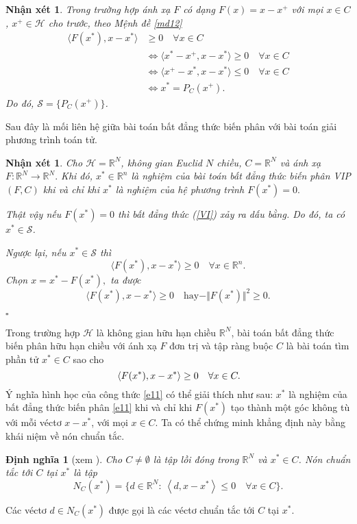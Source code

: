 \documentclass[14pt, oneside,A4paper]{book}
\theoremstyle{plain}
\newcommand{\eproof}{\hfill $\square$}
\newtheorem{nx}[theorem]{\bf Nhận xét}
\newtheorem{dn}[theorem]{\bf Định nghĩa}
\begin{document}
\begin{nx}\rm Trong trường hợp ánh xạ $F$ có dạng $F(x) = x- x^+$ với mọi $x\in C$, $x^+\in \mathcal H$ cho trước, theo Mệnh đề \ref{md12}
	\begin{align*}
	\langle F(x^*), x- x^*\rangle & \ge 0 \quad  \forall x\in C \\
	&\Leftrightarrow  \langle x^*-x^+, x - x^* \rangle \ge 0 \quad \forall x\in C\\
	& \Leftrightarrow  \langle x^+-x^*, x - x^* \rangle \le 0 \quad \forall x\in C  \\
	& \Leftrightarrow   x^* = P_C(x^+).
	\end{align*}
	Do đó, $\mathcal S = \{P_C{(x^+)} \}$.
\end{nx}

Sau đây là mối liên hệ giữa bài toán bất đẳng thức biến phân với bài toán giải phương trình toán tử.
\begin{nx} \rm Cho $\mathcal H = \mathbb {R}^N$, không gian Euclid $N$ chiều, $C= \mathbb {R}^N $ và ánh xạ $F: \mathbb {R}^N\rightarrow \mathbb {R}^N.$ Khi đó, $x^*\in \mathbb {R}^n$ là nghiệm của bài toán bất đẳng thức biến phân VIP$(F,C)$ khi và chỉ khi $x^*$ là nghiệm của hệ phương trình $F(x^*)= 0.$
	
	Thật vậy nếu  $F(x^*)= 0$ thì bất đẳng thức (\ref{VI}) xảy ra dấu bằng. Do đó, ta có $x^*\in \mathcal S$.
	
	Ngược lại, nếu $x^*\in \mathcal S$ thì
	$$\langle F(x^*), x- x^*\rangle  \ge 0 \quad \forall x\in \mathbb {R}^n.$$
	Chọn $x = x^* -F(x^*),$ ta được
	$$\langle F(x^*), x- x^*\rangle  \ge 0\quad \text{hay} -\Vert F(x^*) \Vert^2 \geq 0. $$ 
	
	\eproof
\end{nx}

Trong trường hợp $\mathcal H$ là không gian hữu hạn chiều $\mathbb {R}^N$, bài toán bất đẳng thức biến phân hữu hạn chiều với ánh xạ $F$ đơn trị và tập ràng buộc $C$ là bài toán tìm phần tử $x^* \in C$ sao cho
	\begin{equation}{\label{e11}}
	\left\langle F(x^*), x- x^* \right\rangle \geq 0 \quad \forall x \in C. 
	\end{equation}
Ý nghĩa hình học của công thức \eqref{e11} có thể giải thích như sau: $x^*$ là nghiệm của bất đẳng thức biến phân \eqref{e11} khi và chỉ khi $F(x^*)$ tạo thành một góc không tù với mỗi véctơ $x-x^*$, với mọi $x \in C$. Ta có thể chứng minh khẳng định này bằng khái niệm về nón chuẩn tắc.
\begin{dn}[xem \cite{Kon}] \rm 
	Cho $C \ne \emptyset$ là tập lồi đóng trong $\mathbb {R}^N$ và $x^* \in C$. Nón chuẩn tắc tới $C$ tại $x^*$ là tập
	$$
	N_C(x^*)  =\{d \in \mathbb{R}^N: \ \left\langle d, x-x^*\right\rangle \leq 0 \quad \forall x \in C\}. 
	$$
\end{dn}
Các véctơ $d \in N_C(x^*)$ được gọi là các véctơ chuẩn tắc tới $C$ tại $x^*$. 
\end{document}
